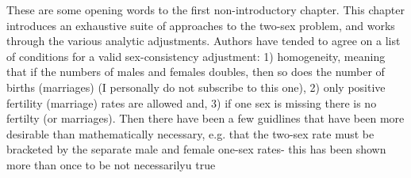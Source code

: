 % 
These are some opening words to the first non-introductory chapter. This chapter introduces an exhaustive suite of
 approaches to the two-sex problem, and works through the various analytic adjustments. Authors have tended to agree on a list of conditions for a valid sex-consistency adjustment: 1) homogeneity, meaning that if the numbers of males and females doubles, then so does the number of births (marriages) (I personally do not subscribe to this one), 2) only positive fertility (marriage) rates are allowed and, 3) if one sex is missing there is no fertilty (or marriages). Then there have been a few guidlines that have been more desirable than mathematically necessary, e.g. that the two-sex rate must be bracketed by the separate male and female one-sex rates- this has been shown more than once to be not necessarilyu true \citep{yellin1977comparison}

